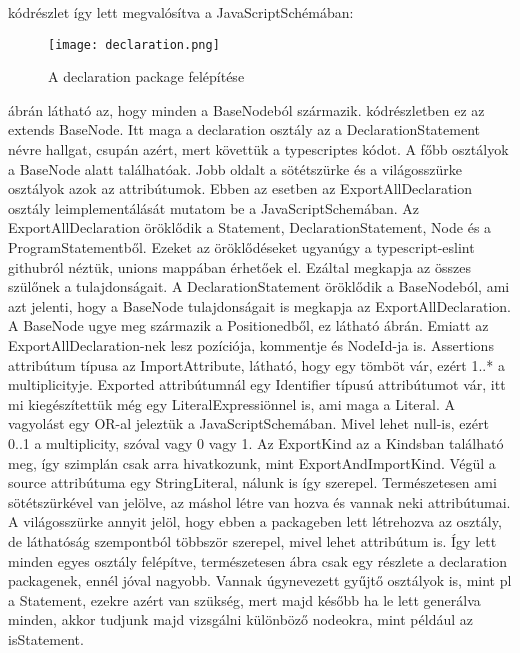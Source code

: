  kódrészlet így lett megvalósítva a JavaScriptSchémában:

\begin{figure}[!htbp]
      \caption{A declaration package felépítése}\label{fig:declaration_vpp}
      \centering
      \texttt{[image: declaration.png]}
\end{figure}

 ábrán látható az, hogy minden a BaseNodeból származik.  kódrészletben ez az extends BaseNode.
Itt maga a declaration osztály az a DeclarationStatement névre hallgat, csupán azért, mert követtük a typescriptes kódot. A főbb osztályok a BaseNode alatt találhatóak.
Jobb oldalt a sötétszürke és a világosszürke osztályok azok az attribútumok.
Ebben az esetben az ExportAllDeclaration osztály leimplementálását mutatom be a JavaScriptSchemában.
Az ExportAllDeclaration öröklődik a Statement, DeclarationStatement, Node és a ProgramStatementből.
Ezeket az öröklődéseket ugyanúgy a typescript-eslint githubról néztük, unions mappában érhetőek el.
Ezáltal megkapja az összes szülőnek a tulajdonságait. A DeclarationStatement öröklődik a BaseNodeból, ami azt jelenti, hogy a BaseNode tulajdonságait is megkapja az ExportAllDeclaration.
A BaseNode ugye meg származik a Positionedből, ez látható  ábrán.
Emiatt az ExportAllDeclaration-nek lesz pozíciója, kommentje és NodeId-ja is.
Assertions attribútum típusa az ImportAttribute, látható, hogy egy tömböt vár, ezért 1..* a multiplicityje.
Exported attribútumnál egy Identifier típusú attribútumot vár, itt mi kiegészítettük még egy LiteralExpressiönnel is, ami maga a Literal.
A vagyolást egy OR-al jeleztük a JavaScriptSchemában.
Mivel lehet null-is, ezért 0..1 a multiplicity, szóval vagy 0 vagy 1.
Az ExportKind az a Kindsban található meg, így szimplán csak arra hivatkozunk, mint ExportAndImportKind.
Végül a source attribútuma egy StringLiteral, nálunk is így szerepel.
Természetesen ami sötétszürkével van jelölve, az máshol létre van hozva és vannak neki attribútumai.
A világosszürke annyit jelöl, hogy ebben a packageben lett létrehozva az osztály, de láthatóság szempontból többször szerepel, mivel lehet attribútum is.
Így lett minden egyes osztály felépítve, természetesen  ábra csak egy részlete a declaration packagenek, ennél jóval nagyobb.
Vannak úgynevezett gyűjtő osztályok is, mint pl a Statement, ezekre azért van szükség, mert majd később ha le lett generálva minden, akkor tudjunk majd vizsgálni különböző nodeokra, mint például az isStatement.

